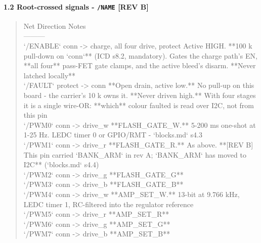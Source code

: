 \documentclass[11pt,a4paper]{article}
\begin{document}
\paragraph*{1.2 Root-crossed signals - \texttt{/NAME}  \textbf{{[}REV B{]}}}
\begin{quote}\small\ttfamily\raggedright
\textbar{} Net \textbar{} Direction \textbar{} Notes \textbar{}\\
\textbar{}---\textbar{}---\textbar{}---\textbar{}\\
\textbar{} `/ENABLE` \textbar{} conn -\textgreater{} charge, all four drive, protect \textbar{} Active HIGH. {*}{*}100 k pull-down on `conn`{*}{*} (ICD s8.2, mandatory). Gates the charge path's EN, {*}{*}all four{*}{*} pass-FET gate clamps, and the active bleed's disarm. {*}{*}Never latched locally{*}{*} \textbar{}\\
\textbar{} `/FAULT` \textbar{} protect -\textgreater{} conn \textbar{} {*}{*}Open drain, active low.{*}{*} No pull-up on this board - the carrier's 10 k owns it. {*}{*}Never driven high.{*}{*} With four stages it is a single wire-OR: {*}{*}which{*}{*} colour faulted is read over I2C, not from this pin \textbar{}\\
\textbar{} `/PWM0` \textbar{} conn -\textgreater{} drive\_w \textbar{} {*}{*}FLASH\_GATE\_W.{*}{*} 5-200 ms one-shot at 1-25 Hz. LEDC timer 0 or GPIO/RMT - `blocks.md` s4.3 \textbar{}\\
\textbar{} `/PWM1` \textbar{} conn -\textgreater{} drive\_r \textbar{} {*}{*}FLASH\_GATE\_R.{*}{*} As above. {*}{*}{[}REV B{]} This pin carried `BANK\_ARM` in rev A; `BANK\_ARM` has moved to I2C{*}{*} (`blocks.md` s4.4) \textbar{}\\
\textbar{} `/PWM2` \textbar{} conn -\textgreater{} drive\_g \textbar{} {*}{*}FLASH\_GATE\_G{*}{*} \textbar{}\\
\textbar{} `/PWM3` \textbar{} conn -\textgreater{} drive\_b \textbar{} {*}{*}FLASH\_GATE\_B{*}{*} \textbar{}\\
\textbar{} `/PWM4` \textbar{} conn -\textgreater{} drive\_w \textbar{} {*}{*}AMP\_SET\_W.{*}{*} 13-bit at 9.766 kHz, LEDC timer 1, RC-filtered into the regulator reference \textbar{}\\
\textbar{} `/PWM5` \textbar{} conn -\textgreater{} drive\_r \textbar{} {*}{*}AMP\_SET\_R{*}{*} \textbar{}\\
\textbar{} `/PWM6` \textbar{} conn -\textgreater{} drive\_g \textbar{} {*}{*}AMP\_SET\_G{*}{*} \textbar{}\\
\textbar{} `/PWM7` \textbar{} conn -\textgreater{} drive\_b \textbar{} {*}{*}AMP\_SET\_B{*}{*} \textbar{}\\

\end{quote}
\end{document}

